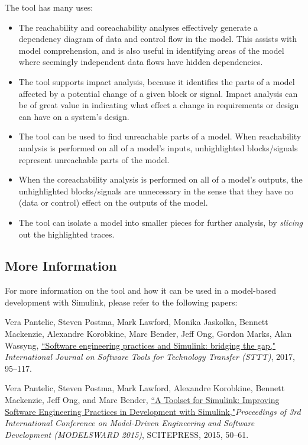 \documentclass{article}
\begin{document}
The tool has many uses:
\begin{itemize}

	\item The reachability and coreachability analyses effectively generate a dependency diagram of data and control flow in the model. This assists with model comprehension, and is also useful in identifying areas of the model where seemingly independent data flows have hidden dependencies.
	\item The tool supports impact analysis, because it identifies the parts of a model affected by a potential change of a given block or signal. Impact analysis can be of great value in indicating what effect a change in requirements or design can have on a system's design.
	\item The tool can be used to find unreachable parts of a model. When reachability analysis is performed on all of a model's inputs, unhighlighted blocks/signals represent unreachable parts of the model. 
	\item When the coreachability analysis is performed on all of a model's outputs, the unhighlighted blocks/signals are unnecessary in the sense that they have no (data or control) effect on the outputs of the model.
	\item The tool can isolate a model into smaller pieces for further analysis, by \emph{slicing} out the highlighted traces.
\end{itemize}

\subsection{More Information}
For more information on the tool and how it can be used in a model-based development with Simulink, please refer to the following papers:

\vspace{1em}
Vera Pantelic, Steven Postma, Mark Lawford, Monika Jaskolka, Bennett Mackenzie, Alexandre Korobkine, Marc Bender, Jeff Ong, Gordon Marks, Alan Wassyng, \href{https://link.springer.com/article/10.1007/s10009-017-0450-9}{``Software engineering practices and Simulink: bridging the gap,"} \textit{International Journal on Software Tools for Technology Transfer (STTT)}, 2017, 95--117.

\vspace{1em}
Vera Pantelic, Steven Postma, Mark Lawford, Alexandre Korobkine, Bennett Mackenzie, Jeff Ong, and Marc Bender, \href{http://www.cas.mcmaster.ca/~lawford/papers/MODELSWARD2015.pdf}{``A Toolset for Simulink: Improving Software Engineering Practices in Development with Simulink,"}\textit{Proceedings of 3rd International Conference on Model-Driven Engineering and Software Development (MODELSWARD 2015)}, SCITEPRESS, 2015, 50--61.
\end{document}
